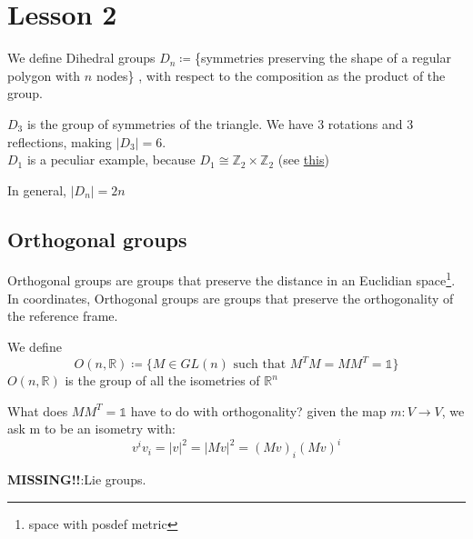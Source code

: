 \section{Lesson 2}
\begin{definition}
  We define Dihedral groups $D_n \coloneqq $\{symmetries preserving the shape of a regular polygon with $n$ nodes\} , with respect to the composition as the product of the group.
\end{definition}

\begin{example}[$D_2$]
  $D_3$ is the group of symmetries of the triangle. We have 3 rotations and 3 reflections, making $|D_3| = 6$. \\
  $D_1$ is a peculiar example, because $D_1 \cong  \mathbb{Z}_2 \times\mathbb{Z}_2$ (see \href{https://en.wikipedia.org/wiki/Dihedral_group}{this}) 

\end{example}
In general, $|D_n| =2n$ 
\subsection{Orthogonal groups}
Orthogonal groups are groups that preserve the distance in an Euclidian space\footnote{space with posdef metric}. In coordinates, Orthogonal groups are groups that preserve the orthogonality of the reference frame.
\begin{definition}
  We define \[
    O(n,\mathbb{R}) \coloneqq \{ M \in GL(n) \,\, \text{such that} \,\, M^T M = MM^T = \mathbb{1} \} 
  \]
  $O(n,\mathbb{R}) $ is the group of all the isometries of $\mathbb{R}^n$
\end{definition}

\begin{question}
 What does $MM^T = \mathbb{1}$ have to do with orthogonality?
 given the map $m : V \rightarrow V $, we ask m to be an isometry with:
 \[
   v^i v_i = |v|^2 = |Mv|^2 = (Mv)_i(Mv)^i
 \]
\end{question}

\textbf{MISSING!!}:Lie groups.
